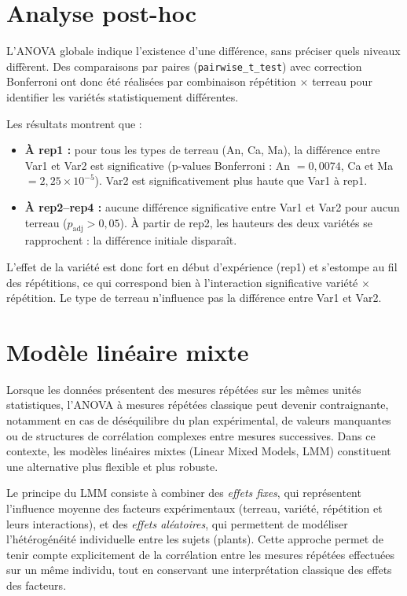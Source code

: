 \documentclass[12pt, a4paper]{report}
\begin{document}
\section{Analyse post-hoc}

L'ANOVA globale indique l'existence d'une différence, sans préciser quels niveaux diffèrent.
Des comparaisons par paires (\texttt{pairwise\_t\_test}) avec correction Bonferroni ont donc
été réalisées par combinaison répétition $\times$ terreau pour identifier les variétés
statistiquement différentes.

Les résultats montrent que :
\begin{itemize}[leftmargin=*, label=\textbullet]
  \item \textbf{À rep1 :} pour tous les types de terreau (An, Ca, Ma), la différence entre
        Var1 et Var2 est significative (p-values Bonferroni : An $= 0{,}0074$, Ca et Ma
        $= 2{,}25 \times 10^{-5}$). Var2 est significativement plus haute que Var1 à rep1.
  \item \textbf{À rep2–rep4 :} aucune différence significative entre Var1 et Var2 pour aucun
        terreau ($p_{\text{adj}} > 0{,}05$). À partir de rep2, les hauteurs des deux variétés
        se rapprochent : la différence initiale disparaît.
\end{itemize}

L'effet de la variété est donc fort en début d'expérience (rep1) et s'estompe au fil des
répétitions, ce qui correspond bien à l'interaction significative variété $\times$ répétition.
Le type de terreau n'influence pas la différence entre Var1 et Var2.

\section{Modèle linéaire mixte}

Lorsque les données présentent des mesures répétées sur les mêmes unités statistiques,
l’ANOVA à mesures répétées classique peut devenir contraignante, notamment en cas de
déséquilibre du plan expérimental, de valeurs manquantes ou de structures de corrélation
complexes entre mesures successives. Dans ce contexte, les modèles linéaires mixtes (Linear
Mixed Models, LMM) constituent une alternative plus flexible et plus robuste.

Le principe du LMM consiste à combiner des \textit{effets fixes}, qui représentent l’influence
moyenne des facteurs expérimentaux (terreau, variété, répétition et leurs interactions), et
des \textit{effets aléatoires}, qui permettent de modéliser l’hétérogénéité individuelle entre
les sujets (plants). Cette approche permet de tenir compte explicitement de la corrélation
entre les mesures répétées effectuées sur un même individu, tout en conservant une
interprétation classique des effets des facteurs.
\end{document}
